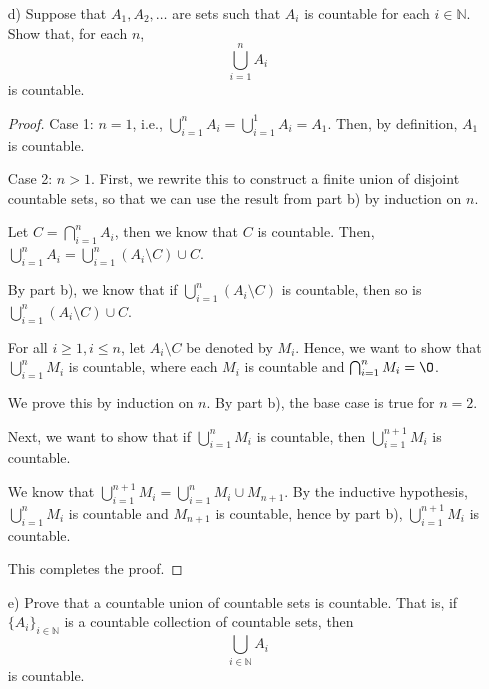 \documentclass[11pt]{article}
\newcommand{\bbN}{\mathbb{N}}
\newcommand{\bbZ}{\mathbb{Z}}
\renewcommand{\emptyset}{\O}
\theoremstyle{definition}
\numberwithin{equation}{subsection}
\begin{document}
\begin{enumerate}
\begin{enumerate}
\begin{proof}
By part b), $\bbN$ is countable and $\bbN_0 \cup \{0\}$ is countable, and they are disjoint, hence $\bbN \cup \bbN_0 \cup \{0\}$ is countable. Therefore, $\bbZ$ is countable.

\renewcommand\qedsymbol{QED}
\end{proof}

 \item[d)] Suppose that $A_1, A_2, \dots$ are sets such that $A_i$ is countable for each $i \in\bbN$. Show that, for each $n$, \[\bigcup_{i=1}^n A_i\] is countable.

\begin{proof}
Case 1: $n=1$, i.e., $\bigcup_{i=1}^n A_i = \bigcup_{i=1}^1 A_i = A_1$. Then, by definition, $A_1$ is countable. 

Case 2: $n>1$. First, we rewrite this to construct a finite union of disjoint countable sets, so that we can use the result from part b) by induction on $n$. 

Let $C = \bigcap_{i=1}^n A_i$, then we know that $C$ is countable. Then, $\bigcup_{i=1}^n A_i = \bigcup_{i=1}^n (A_i \setminus C) \cup C$. 

By part b), we know that if $\bigcup_{i=1}^n (A_i \setminus C)$ is countable, then so is $\bigcup_{i=1}^n (A_i \setminus C) \cup C$. 

For all $i \geq 1, i \leq n$, let $A_i \setminus C$ be denoted by $M_i$. Hence, we want to show that $\bigcup_{i=1}^n M_i$ is countable, where each $M_i$ is countable and $\bigcap_{i=1}^n M_i = \emptyset$.

We prove this by induction on $n$. By part b), the base case is true for $n = 2$. 

Next, we want to show that if $\bigcup_{i=1}^n M_i$ is countable, then $\bigcup_{i=1}^{n+1} M_i$ is countable.

We know that $\bigcup_{i=1}^{n+1} M_i = \bigcup_{i=1}^n M_i \cup M_{n+1}$. By the inductive hypothesis, $\bigcup_{i=1}^n M_i$ is countable and $M_{n+1}$ is countable, hence by part b), $\bigcup_{i=1}^{n+1} M_i$ is countable.

This completes the proof.

\renewcommand\qedsymbol{QED}
\end{proof}

     \item[e)] Prove that a countable union of countable sets is countable. That is, if $\{A_i\}_{i\in\bbN} $ is a countable  collection of countable sets, then 
  $$\bigcup_{i\in\bbN} A_i$$ 
  is countable.


\end{enumerate}
\end{enumerate}
\end{document}
